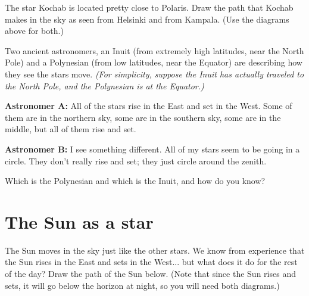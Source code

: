\documentclass[12pt]{article}
\newcommand{\insp}{\vspace{1in}}
\begin{document}
The star Kochab is located pretty close to Polaris. Draw the path that Kochab makes in the sky as seen from Helsinki and from Kampala. (Use the diagrams above for both.)

\insp

Two ancient astronomers, an Inuit (from extremely high latitudes, near the North Pole) and a Polynesian (from low latitudes, near the Equator) are describing how they see the stars move. {\it (For simplicity, suppose the Inuit has actually traveled to the North Pole, and the Polynesian is at the Equator.)}

{\bf Astronomer A:} All of the stars rise in the East and set in the West. Some of them are in the northern sky, some are in the southern sky, some are in the middle, but all of them rise and set.

{\bf Astronomer B:} I see something different. All of my stars seem to be going in a circle. They don't really rise and set; they just circle around the zenith. 

\bigskip

Which is the Polynesian and which is the Inuit, and how do you know?


\newpage

\section{The Sun as a star}

The Sun moves in the sky just like the other stars. We know from experience that the Sun rises in the East and sets in the West... but what does it do for the rest of the day? Draw the path of the Sun below. (Note that since the Sun rises and sets, it will go below the horizon at night, so you will need both diagrams.)
\end{document}
